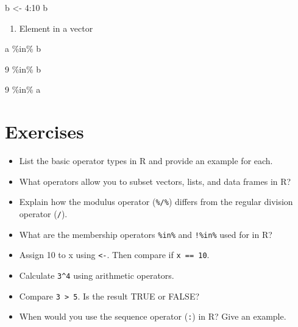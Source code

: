 \documentclass[
  letterpaper,
  DIV=11,
  numbers=noendperiod]{scrreprt}
\newenvironment{Shaded}{}{}
\newcommand{\DecValTok}[1]{\textcolor[rgb]{0.00,0.36,0.77}{#1}}
\newcommand{\NormalTok}[1]{\textcolor[rgb]{0.14,0.16,0.18}{#1}}
\newcommand{\OtherTok}[1]{\textcolor[rgb]{0.44,0.26,0.76}{#1}}
\newcommand{\SpecialCharTok}[1]{\textcolor[rgb]{0.00,0.36,0.77}{#1}}
\providecommand{\tightlist}{%
  \setlength{\itemsep}{0pt}\setlength{\parskip}{0pt}}\usepackage{longtable,booktabs,array}
\begin{document}
\begin{Shaded}
\begin{Highlighting}[]
\NormalTok{b }\OtherTok{\textless{}{-}} \DecValTok{4}\SpecialCharTok{:}\DecValTok{10}
\NormalTok{b}
\end{Highlighting}
\end{Shaded}

\begin{enumerate}
\def\labelenumi{\alph{enumi}.}
\setcounter{enumi}{1}
\tightlist
\item
  Element in a vector
\end{enumerate}

\begin{Shaded}
\begin{Highlighting}[]
\NormalTok{a }\SpecialCharTok{\%in\%}\NormalTok{ b}
\end{Highlighting}
\end{Shaded}

\begin{Shaded}
\begin{Highlighting}[]
\DecValTok{9} \SpecialCharTok{\%in\%}\NormalTok{ b}
\end{Highlighting}
\end{Shaded}

\begin{Shaded}
\begin{Highlighting}[]
\DecValTok{9} \SpecialCharTok{\%in\%}\NormalTok{ a}
\end{Highlighting}
\end{Shaded}

\section{Exercises}\label{exercises-6}

\begin{itemize}
\item
  List the basic operator types in R and provide an example for each.
\item
  What operators allow you to subset vectors, lists, and data frames in
  R?
\item
  Explain how the modulus operator (\texttt{\%/\%}) differs from the
  regular division operator (\texttt{/}).
\item
  What are the membership operators \texttt{\%in\%} and \texttt{!\%in\%}
  used for in R?
\item
  Assign 10 to x using \texttt{\textless{}-}. Then compare if
  \texttt{x\ ==\ 10}.
\item
  Calculate \texttt{3\^{}4} using arithmetic operators.
\item
  Compare \texttt{3\ \textgreater{}\ 5}. Is the result TRUE or FALSE?
\item
  When would you use the sequence operator (\texttt{:}) in R? Give an
  example.
\end{itemize}
\end{document}
